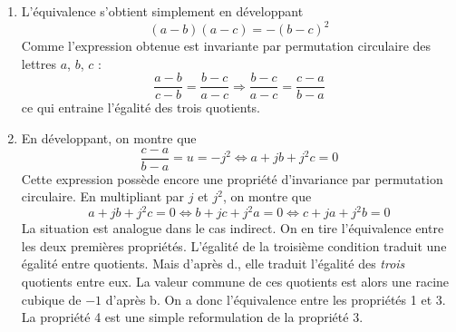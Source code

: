 \begin{enumerate}
\item L'équivalence s'obtient simplement en développant
\begin{displaymath}
 (a-b)(a-c) = -(b-c)^2
\end{displaymath}
Comme l'expression obtenue est invariante par permutation circulaire des lettres $a$, $b$, $c$ :
\begin{displaymath}
 \frac{a-b}{c-b} = \frac{b-c}{a-c}
\Rightarrow
\frac{b-c}{a-c} = \frac{c-a}{b-a}
\end{displaymath}
ce qui entraine l'égalité des trois quotients.
\item En développant, on montre que
\begin{displaymath}
 \frac{c-a}{b-a}=u=-j^2
\Leftrightarrow
a+jb+j^2c=0
\end{displaymath}
Cette expression possède encore une propriété d'invariance par permutation circulaire. 
En multipliant par $j$ et $j^2$, on montre que 
\begin{displaymath}
 a+jb+j^2c=0 \Leftrightarrow b+jc+j^2a=0 \Leftrightarrow c+ja+j^2b=0
\end{displaymath}
La situation est analogue dans le cas indirect. On en tire l'équivalence entre les deux premières propriétés.\newline
L'égalité de la troisième condition traduit une égalité entre quotients. Mais d'après d., elle traduit l'égalité des \emph{trois} quotients entre eux. La valeur commune de ces quotients est alors une racine cubique de $-1$ d'après b. On a donc l'équivalence entre les propriétés 1 et 3.\newline
La propriété 4 est une simple reformulation de la propriété $3$.
\end{enumerate}
 